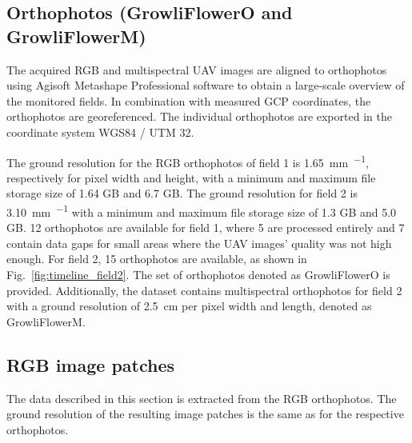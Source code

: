 \documentclass{article}
\def\figref#1{Fig.~\ref{#1}}
\begin{document}
\subsection{Orthophotos (GrowliFlowerO and GrowliFlowerM)}\label{sec:orthophotos}

The acquired RGB and multispectral UAV images are aligned to orthophotos using Agisoft Metashape Professional software to obtain a large-scale overview of the monitored fields. In combination with measured GCP coordinates, the orthophotos are georeferenced. 
The individual orthophotos are exported in the coordinate system WGS84 / UTM 32. 

The ground resolution for the RGB orthophotos of field 1 is \SI{1.65}{\milli\meter\per\px}, respectively for pixel width and height, with a minimum and maximum file storage size of 1.64 GB and 6.7 GB. The ground resolution for field 2 is \SI{3.10}{\milli\meter\per\px} with a minimum and maximum file storage size of 1.3 GB and 5.0 GB.
%
12 orthophotos are available for field 1, where 5 are processed entirely and 7 contain data gaps for small areas where the UAV images' quality was not high enough.
For field 2, 15 orthophotos are available, as shown in \figref{fig:timeline_field2}. 
The set of orthophotos denoted as GrowliFlowerO is provided.
Additionally, the dataset contains multispectral orthophotos for field 2 with a ground resolution of \SI{2.5}{\centi\meter} per pixel width and length, denoted as GrowliFlowerM.

\subsection{RGB image patches}
The data described in this section is extracted from the RGB orthophotos. The ground resolution of the resulting image patches is the same as for the respective orthophotos. 
\end{document}
